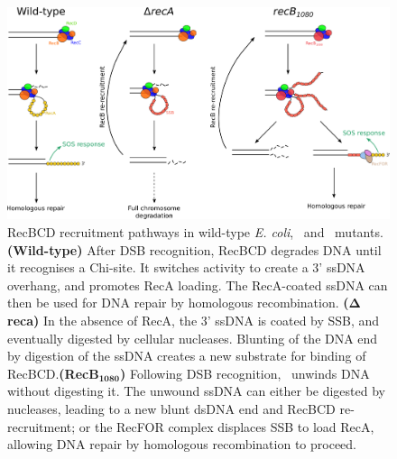\begin{figure}[htbp]
    \centering
    \includegraphics[width=\textwidth]{Figures/Fig_mutants_pathways.pdf}
    \caption{RecBCD recruitment pathways in wild-type \emph{E. coli}, \dreca\ and \geneteneighty\ mutants. \textbf{(Wild-type)} After DSB recognition, RecBCD degrades DNA until it recognises a Chi-site. It switches activity to create a 3' ssDNA overhang, and promotes RecA loading. The RecA-coated ssDNA can then be used for DNA repair by homologous recombination. \textbf{($\mathbf{\Delta}$reca)} In the absence of RecA, the 3' ssDNA is coated by SSB, and eventually digested by cellular nucleases. Blunting of the DNA end by digestion of the ssDNA creates a new substrate for binding of RecBCD.\@ \textbf{(RecB$\mathbf{_{1080}}$)} Following DSB recognition, \teneighty\ unwinds DNA without digesting it. The unwound ssDNA can either be digested by nucleases, leading to a new blunt dsDNA end and RecBCD re-recruitment; or the RecFOR complex displaces SSB to load RecA, allowing DNA repair by homologous recombination to proceed.}\label{Fig:pathways}
\end{figure}


